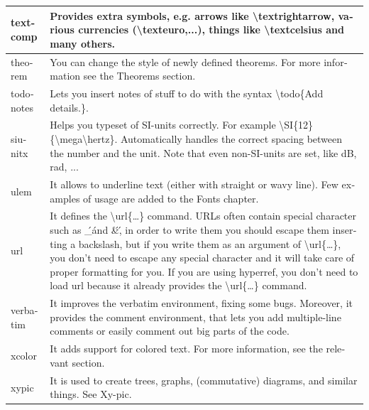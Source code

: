 \begin{latin}
\begin{longtable}{| p{} | p{} |}
textcomp &Provides extra symbols, e.g. arrows like \textbackslash{textrightarrow}, various currencies (\textbackslash{texteuro},...), things like \textbackslash{textcelsius} and many others.\\\hline
theorem &You can change the style of newly defined theorems. For more information see the Theorems section.\\\hline
todonotes &Lets you insert notes of stuff to do with the syntax \textbackslash{todo}\{Add details.\}.\\\hline
siunitx &Helps you typeset of SI-units correctly. For example \textbackslash{SI}\{12\}\{\textbackslash{mega}\textbackslash{hertz}\}. Automatically handles the correct spacing between the number and the unit. Note that even non-SI-units are set, like dB, rad, ...\\\hline
ulem &It allows to underline text (either with straight or wavy line). Few examples of usage are added to the Fonts chapter.\\\hline
url &It defines the \textbackslash{url}\{\dots\} command. URLs often contain special character such as \'\_\' and \'\&\', in order to write them you should escape them inserting a backslash, but if you write them as an argument of \textbackslash{url}\{\dots\}, you don't need to escape any special character and it will take care of proper formatting for you. If you are using hyperref, you don't need to load url because it already provides the \textbackslash{url}\{\dots\} command.\\\hline
verbatim &It improves the verbatim environment, fixing some bugs. Moreover, it provides the comment environment, that lets you add multiple-line comments or easily comment out big parts of the code.\\\hline
xcolor &It adds support for colored text. For more information, see the relevant section.\\\hline
xypic &It is used to create trees, graphs, (commutative) diagrams, and similar things. See Xy-pic.\\\hline
\end{longtable}
\end{latin}

